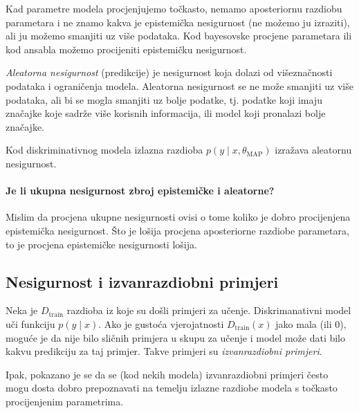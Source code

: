 \documentclass[twocolumn]{article}
\begin{document}
Kad parametre modela procjenjujemo točkasto, nemamo aposteriornu razdiobu parametara i ne znamo kakva je epistemička nesigurnost (ne možemo ju izraziti), ali ju možemo smanjiti uz više podataka. Kod bayesovske procjene parametara ili kod ansabla možemo procijeniti epistemičku nesigurnost.

\emph{Aleatorna nesigurnost} (predikcije) je nesigurnost koja dolazi od višeznačnosti podataka i ograničenja modela. Aleatorna nesigurnost se ne može smanjiti uz više podataka, ali bi se mogla smanjiti uz bolje podatke, tj. podatke koji imaju značajke koje sadrže više korisnih informacija, ili model koji pronalazi bolje značajke.

Kod diskriminativnog modela izlazna razdioba $p(y\mid x, \theta_\text{MAP})$ izražava aleatornu nesigurnost.

\paragraph{Je li ukupna nesigurnost zbroj epistemičke i aleatorne?}
Mislim da procjena ukupne nesigurnosti ovisi o tome koliko je dobro procijenjena epistemička nesigurnost. Što je lošija procjena aposteriorne razdiobe parametara, to je procjena epistemičke nesigurnosti lošija.


\subsection{Nesigurnost i izvanrazdiobni primjeri}

Neka je $D_{\text{train}}$ razdioba iz koje su došli primjeri za učenje. Diskrimanativni model uči funkciju $p(y\mid x)$. Ako je gustoća vjerojatnosti $D_{\text{train}}(x)$ jako mala (ili $0$), moguće je da nije bilo sličnih primjera u skupu za učenje i model može dati bilo kakvu predikciju za taj primjer. Takve primjeri su \emph{izvanrazdiobni primjeri}.

Ipak, pokazano je se da se (kod nekih modela) izvanrazdiobni primjeri često mogu dosta dobro prepoznavati na temelju izlazne razdiobe modela s točkasto procijenjenim parametrima. 
\end{document}
